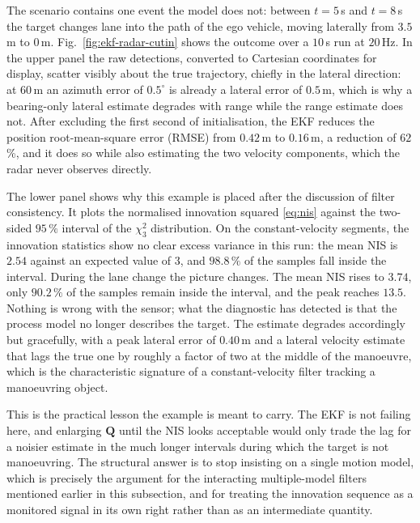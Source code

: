 \begin{example}
The scenario contains one event the model does not: between $t=5$\,s and
$t=8$\,s the target changes lane into the path of the ego vehicle, moving
laterally from $3.5$\,m to $0$\,m. Fig.~\ref{fig:ekf-radar-cutin} shows the
outcome over a $10$\,s run at $20$\,Hz. In the upper panel the raw detections,
converted to Cartesian coordinates for display, scatter visibly about the true
trajectory, chiefly in the lateral direction: at $60$\,m an azimuth error of
$0.5^{\circ}$ is already a lateral error of $0.5$\,m, which is why a bearing-only
lateral estimate degrades with range while the range estimate does not. After excluding the first second of initialisation, the EKF reduces the position root-mean-square error (RMSE) from $0.42$\,m to $0.16$\,m, a reduction of
$62$\,\%, and it does so while also estimating the two velocity components, which
the radar never observes directly.

The lower panel shows why this example is placed after the discussion of filter
consistency. It plots the normalised innovation squared \eqref{eq:nis} against
the two-sided $95\,\%$ interval of the $\chi^{2}_{3}$ distribution. On the
constant-velocity segments, the innovation statistics show no clear excess variance in this run: the
mean NIS is $2.54$ against an expected value of $3$, and $98.8\,\%$ of the
samples fall inside the interval. During the lane change the picture changes.
The mean NIS rises to $3.74$, only $90.2\,\%$ of the samples remain inside the
interval, and the peak reaches $13.5$. Nothing is wrong with the sensor; what
the diagnostic has detected is that the process model no longer describes the
target. The estimate degrades accordingly but gracefully, with a peak lateral
error of $0.40$\,m and a lateral velocity estimate that lags the true one by
roughly a factor of two at the middle of the manoeuvre, which is the
characteristic signature of a constant-velocity filter tracking a manoeuvring
object.

This is the practical lesson the example is meant to carry. The EKF is not
failing here, and enlarging $\mathbf{Q}$ until the NIS looks acceptable would
only trade the lag for a noisier estimate in the much longer intervals during
which the target is not manoeuvring. The structural answer is to stop insisting
on a single motion model, which is precisely the argument for the interacting
multiple-model filters mentioned earlier in this subsection, and for treating
the innovation sequence as a monitored signal in its own right rather than as an
intermediate quantity.
\end{example}


